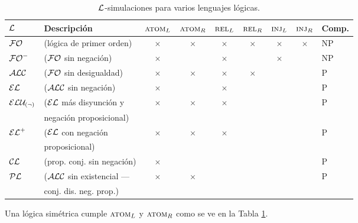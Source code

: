\begin{table}[t]

\begin{tabular}{|l|l|cccccc|l|}
\hline
  $\mathcal{L}$ & Descripci\'on &$\textsc{atom}_L$ & $\textsc{atom}_R$ & $\textsc{rel}_L$ & $\textsc{rel}_R$ & $\textsc{inj}_L\space$ & $\textsc{inj}_R\space$ & Comp.\\
  \hline
  $\mathcal{FO}$ & (l\'ogica de primer orden)  & $\times$ & $\times$ & $\times$ & $\times$ & $\times$ & $\times$ & NP\\ \hline
  ${\mathcal{FO}^-}$ & ($\mathcal{FO}$ sin negaci\'on) & $\times$ & & $\times$ && $\times$ & & NP\\ \hline 
  $\mathcal{ALC}$   & ($\mathcal{FO}$ sin desigualdad) & $\times$ & $\times$ & $\times$ & $\times$&& & P\\ \hline
  $\mathcal{EL}$   & ($\mathcal{ALC}$ sin negaci\'on) & $\times$ & &  $\times$ & & & &P\\ \hline
	$\mathcal{ELU_{(\neg)} }$ & ($\mathcal{EL}$ m\'as disyunci\'on y  & $\times$ & $\times$ &  $\times$ & & & &P\\ 
	&negaci\'on proposicional)&&&&&&&\\ \hline
  ${\mathcal{EL}^+}$ & ($\mathcal{EL}$ con negaci\'on & $\times$ & $\times$ &  $\times$ & & & &P\\ 
	&proposicional) &&&&&&& \\ \hline
	$\mathcal{CL}$ & (prop. conj. sin negaci\'on)& $\times$ &  &  & & & &P\\ \hline
	$\mathcal{PL}$ & ($\mathcal{ALC}$ sin existencial --- & $\times$ & $\times$ & & & & &P\\ 
	&conj. dis. neg. prop.)&&&&&&&\\ 
\hline	
\end{tabular}

\caption{$\mathcal{L}$-simulaciones para varios lenguajes l\'ogicas.}\label{tab:simuls}
\end{table}


Una l\'ogica sim\'etrica cumple  $\textsc{atom}_L$ y $\textsc{atom}_R$ como se ve en la Tabla \ref{tab:simuls}. 


